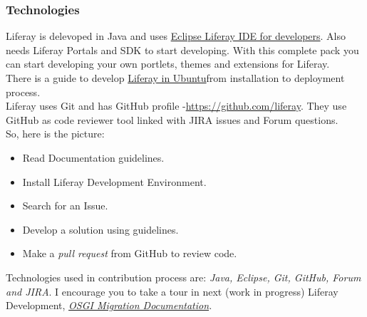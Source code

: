 \subsubsection{ Technologies} Liferay is delevoped in Java and uses \href{http://sourceforge.net/projects/lportal/files/Liferay%20IDE/1.4.0/liferay-ide-eclipse-updatesite-1.4.0.zip/download}{Eclipse Liferay IDE for developers}. Also needs Liferay Portals and SDK to start developing. With this complete pack you can start developing your own portlets, themes and extensions for Liferay.
\\ There is a guide to develop \href{http://www.liferay.com/community/wiki/-/wiki/Main/Liferay+6.0+Development+on+Ubuntu+Maverick+10.10}{Liferay in Ubuntu}\nolinebreakexplaining from installation to deployment process.
\\ Liferay uses Git and has GitHub profile -\nolinebreak\href{https://github.com/liferay}{https://github.com/liferay}. They use GitHub as code reviewer tool linked with JIRA issues and Forum questions.
\\ So, here is the picture:
\begin{itemize}
	\item Read Documentation guidelines.
	\item Install Liferay Development Environment.
	\item Search for an Issue.
	\item Develop a solution using guidelines.
	\item Make a \textit{pull request} from GitHub to review code.
\end{itemize} Technologies used in contribution process are: \textit{Java, Eclipse, Git, GitHub, Forum and JIRA}. I encourage you to take a tour in next (work in progress) Liferay Development, \textit{\href{http://www.liferay.com/es/documentation/liferay-portal/6.1/user-guide/-/ai/osgi}{OSGI Migration Documentation}.}